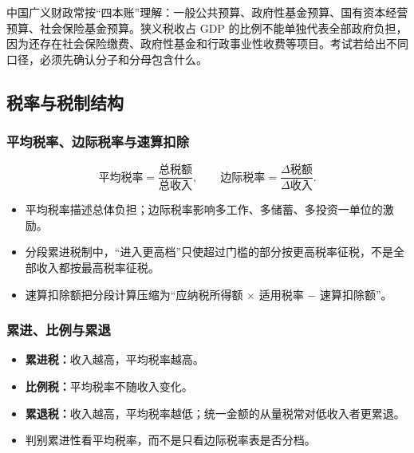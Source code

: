 \documentclass[UTF8,11pt,a4paper]{ctexart}
\newcommand{\term}[1]{\textbf{#1}}
\begin{document}
\begin{detailbox}[讲义中的财政口径]
中国广义财政常按“四本账”理解：一般公共预算、政府性基金预算、国有资本经营预算、社会保险基金预算。狭义税收占 GDP 的比例不能单独代表全部政府负担，因为还存在社会保险缴费、政府性基金和行政事业性收费等项目。考试若给出不同口径，必须先确认分子和分母包含什么。
\end{detailbox}

\subsection{税率与税制结构}
\subsubsection{平均税率、边际税率与速算扣除}
\[
\text{平均税率}=\frac{\text{总税额}}{\text{总收入}},
\qquad
\text{边际税率}=\frac{\Delta\text{税额}}{\Delta\text{收入}}.
\]
\begin{itemize}
  \item 平均税率描述总体负担；边际税率影响多工作、多储蓄、多投资一单位的激励。
  \item 分段累进税制中，“进入更高档”只使超过门槛的部分按更高税率征税，不是全部收入都按最高税率征税。
  \item 速算扣除额把分段计算压缩为“应纳税所得额 $\times$ 适用税率 $-$ 速算扣除额”。
\end{itemize}

\subsubsection{累进、比例与累退}
\begin{itemize}
  \item \term{累进税：}收入越高，平均税率越高。
  \item \term{比例税：}平均税率不随收入变化。
  \item \term{累退税：}收入越高，平均税率越低；统一金额的从量税常对低收入者更累退。
  \item 判别累进性看平均税率，而不是只看边际税率表是否分档。
\end{itemize}
\end{document}
